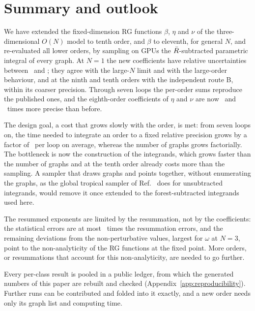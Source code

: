 \section{Summary and outlook}
\label{sec:summary}

We have extended the fixed-dimension RG functions $\beta$, $\eta$ and $\nu$ of the three-dimensional $O(N)$ model to
tenth order, and $\beta$ to eleventh, for general $N$, and re-evaluated all lower orders, by sampling on GPUs the
$\bar R$-subtracted parametric integral of every graph. At $N=1$ the new coefficients have relative uncertainties between
\newrelmin\ and \newrelmax; they agree with the large-$N$ limit and with the large-order behaviour, and at the ninth and
tenth orders with the independent route B, within its coarser precision. Through seven loops the per-order sums
reproduce the published ones, and the eighth-order coefficients of $\eta$ and $\nu$ are now \etaEightGain\ and
\nuEightGain\ times more precise than before.

The design goal, a cost that grows slowly with the order, is met: from seven loops on, the time needed to integrate an
order to a fixed relative precision grows by a factor of \costgrowthrange\ per loop on average, whereas the number of graphs grows
factorially. The bottleneck is now the construction of the integrands, which grows faster than the number of graphs and at the
tenth order already costs more than the sampling. A sampler that draws graphs and points together, without enumerating
the graphs, as the global tropical sampler of Ref.~\cite{Borinsky2025global} does for unsubtracted integrands, would
remove it once extended to the forest-subtracted integrands used here.

The resummed exponents are limited by the resummation, not by the coefficients: the statistical errors are at most
\rsStatRatio\ times the resummation errors, and the remaining deviations from the non-perturbative values, largest
for $\omega$ at $N=3$, point to the non-analyticity of the RG functions at the fixed point. More orders, or resummations
that account for this non-analyticity, are needed to go further.

Every per-class result is pooled in a public ledger, from which the generated numbers of this paper are rebuilt and
checked (Appendix~\ref{app:reproducibility}). Further runs can be contributed and folded into it exactly, and a new
order needs only its graph list and computing time.
